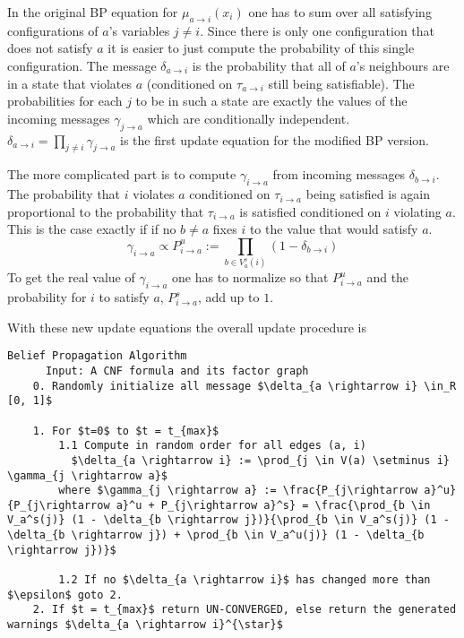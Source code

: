 In the original BP equation for $\mu_{a \rightarrow i}(x_i)$ one has to sum over all satisfying configurations of $a$'s variables $j \neq i$. Since there is only one configuration that does not satisfy $a$ it is easier to just compute the probability of this single configuration. The message $\delta_{a \rightarrow i}$ is the probability that all of $a$'s neighbours are in a state that violates $a$ (conditioned on $\tau_{a \rightarrow i}$ still being satisfiable). The probabilities for each $j$ to be in such a state are exactly the values of the incoming messages $\gamma_{j \rightarrow a}$ which are conditionally independent.
$\delta_{a \rightarrow i} = \prod_{j \neq i} \gamma_{j \rightarrow a}$ is the first update equation for the modified BP version.

The more complicated part is to compute $\gamma_{i \rightarrow a}$ from incoming messages $\delta_{b \rightarrow i}$. The probability that $i$ violates $a$ conditioned on $\tau_{i \rightarrow a}$ being satisfied is again proportional to the probability  that $\tau_{i \rightarrow a}$ is satisfied conditioned on $i$ violating $a$. This is the case exactly if if no $b \neq a$ fixes $i$ to the value that would satisfy $a$.
$$\gamma_{i \rightarrow a} \propto P_{i \rightarrow a}^u := \prod_{b \in V_a^s(i)} (1 - \delta_{b \rightarrow i})$$
To get the real value of $\gamma_{i \rightarrow a}$ one has to normalize so that $P_{i \rightarrow a}^u$ and the probability for $i$ to satisfy $a$, $P_{i \rightarrow a}^s$, add up to $1$.

With these new update equations the overall update procedure is

\begin{lstlisting}[mathescape=true, frame = single]
	Belief Propagation Algorithm
	  Input: A CNF formula and its factor graph
	0. Randomly initialize all message $\delta_{a \rightarrow i} \in_R [0, 1]$
	
	1. For $t=0$ to $t = t_{max}$
		1.1 Compute in random order for all edges (a, i)
		  $\delta_{a \rightarrow i} := \prod_{j \in V(a) \setminus i} \gamma_{j \rightarrow a}$		 
		where $\gamma_{j \rightarrow a} := \frac{P_{j\rightarrow a}^u}{P_{j\rightarrow a}^u + P_{j\rightarrow a}^s} = \frac{\prod_{b \in V_a^s(j)} (1 - \delta_{b \rightarrow j})}{\prod_{b \in V_a^s(j)} (1 - \delta_{b \rightarrow j}) + \prod_{b \in V_a^u(j)} (1 - \delta_{b \rightarrow j})}$
		 		
		1.2 If no $\delta_{a \rightarrow i}$ has changed more than $\epsilon$ goto 2.
	2. If $t = t_{max}$ return UN-CONVERGED, else return the generated warnings $\delta_{a \rightarrow i}^{\star}$
\end{lstlisting}

